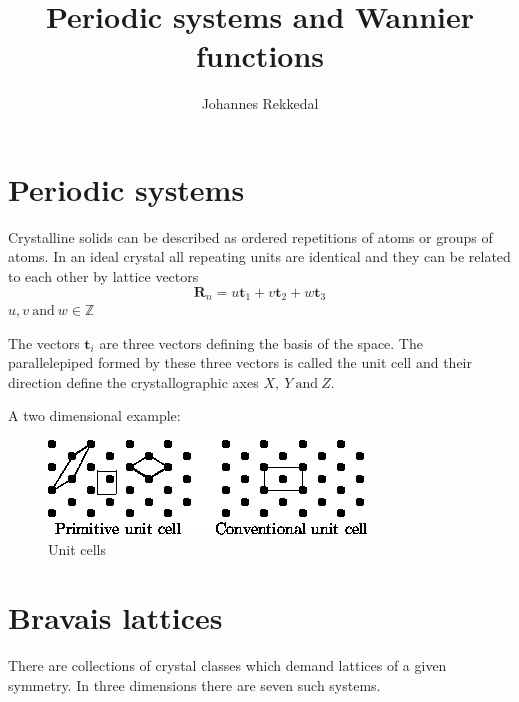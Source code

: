 \documentclass[12pt,a4paper,english]{beamer}
\title{Periodic systems and Wannier functions}
\newcommand{\mbf}{ \mathbf }
\begin{document}
\date{}
\author{Johannes Rekkedal}
\frame{\titlepage}
\begin{frame}
  \tableofcontents
\end{frame}
\section{Periodic systems}
\begin{frame}
 Crystalline solids can be described as ordered repetitions of atoms or groups
 of atoms. In an ideal crystal all repeating units are 
 identical and they can be related to each other by  lattice vectors
 \begin{equation*}
   \mbf R_n= u\mbf t_1 + v\mbf t_2 + w\mbf t_3
 \end{equation*}
 $u,v~\mbox{and}~w\in \mathbb{Z}$
\end{frame}
\begin{frame}
 The vectors $\mbf t_i$ are three vectors defining the
 basis of the space.
 The parallelepiped formed by these three vectors is called the unit cell and
 their direction define the crystallographic axes $X,~Y~\mbox{and}~Z$.
\end{frame}
\begin{frame}
  A two dimensional example: 
  \begin{figure}[htp]
\centering
\includegraphics[scale=1.0]{img28}
\caption{Unit cells}
\label{hullpartlinje}
\end{figure}
\end{frame}

%
\section{Bravais lattices}

\begin{frame}
  There are collections of crystal classes which demand lattices of a given
  symmetry. 
  In three dimensions there are seven such systems.
\end{frame}
\end{document}
